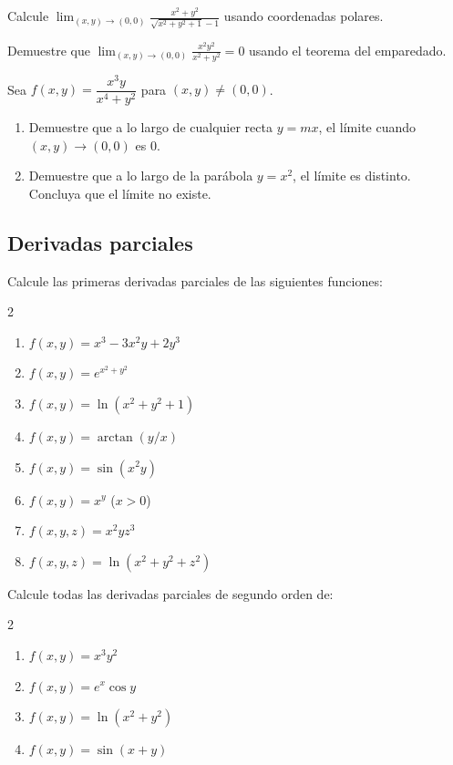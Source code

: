 \begin{prob}
Calcule $\displaystyle\lim_{(x,y)\to(0,0)} \frac{x^2+y^2}{\sqrt{x^2+y^2+1}-1}$
usando coordenadas polares.
\end{prob}

\begin{prob}
Demuestre que $\displaystyle\lim_{(x,y)\to(0,0)} \frac{x^2 y^2}{x^2+y^2}=0$
usando el teorema del emparedado.
\end{prob}

\begin{prob}
Sea $f(x,y)=\dfrac{x^3 y}{x^4+y^2}$ para $(x,y)\neq(0,0)$.
\begin{enumerate}
    \item Demuestre que a lo largo de cualquier recta $y=mx$, el límite
    cuando $(x,y)\to(0,0)$ es $0$.
    \item Demuestre que a lo largo de la parábola $y=x^2$, el límite
    es distinto. Concluya que el límite no existe.
\end{enumerate}
\end{prob}

\subsection*{Derivadas parciales}

\begin{prob}
Calcule las primeras derivadas parciales de las siguientes funciones:
\begin{multicols}{2}
\begin{enumerate}
    \item $f(x,y)=x^3-3x^2 y+2y^3$
    \item $f(x,y)=e^{x^2+y^2}$
    \item $f(x,y)=\ln(x^2+y^2+1)$
    \item $f(x,y)=\arctan(y/x)$
    \item $f(x,y)=\sin(x^2 y)$
    \item $f(x,y)=x^y$ ($x>0$)
    \item $f(x,y,z)=x^2 y z^3$
    \item $f(x,y,z)=\ln(x^2+y^2+z^2)$
\end{enumerate}
\end{multicols}
\end{prob}

\begin{prob}
Calcule todas las derivadas parciales de segundo orden de:
\begin{multicols}{2}
\begin{enumerate}
    \item $f(x,y)=x^3 y^2$
    \item $f(x,y)=e^x\cos y$
    \item $f(x,y)=\ln(x^2+y^2)$
    \item $f(x,y)=\sin(x+y)$
\end{enumerate}
\end{multicols}
\end{prob}

